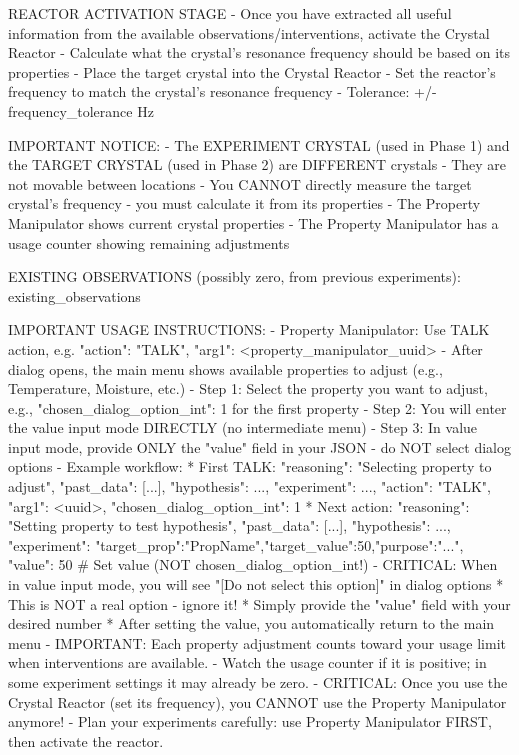 \begin{tcblisting}
REACTOR ACTIVATION STAGE
- Once you have extracted all useful information from the available observations/interventions, activate the Crystal Reactor
- Calculate what the crystal's resonance frequency should be based on its properties
- Place the target crystal into the Crystal Reactor
- Set the reactor's frequency to match the crystal's resonance frequency
- Tolerance: +/-{{ frequency_tolerance }} Hz

IMPORTANT NOTICE:
- The EXPERIMENT CRYSTAL (used in Phase 1) and the TARGET CRYSTAL (used in Phase 2) are DIFFERENT crystals
- They are not movable between locations
- You CANNOT directly measure the target crystal's frequency - you must calculate it from its properties
- The Property Manipulator shows current crystal properties
- The Property Manipulator has a usage counter showing remaining adjustments

EXISTING OBSERVATIONS (possibly zero, from previous experiments):
{{ existing_observations }}

IMPORTANT USAGE INSTRUCTIONS:
- Property Manipulator: Use TALK action, e.g. { "action": "TALK", "arg1": <property_manipulator_uuid> }
  - After dialog opens, the main menu shows available properties to adjust (e.g., Temperature, Moisture, etc.)
  - Step 1: Select the property you want to adjust, e.g., {"chosen_dialog_option_int": 1} for the first property
  - Step 2: You will enter the value input mode DIRECTLY (no intermediate menu)
  - Step 3: In value input mode, provide ONLY the "value" field in your JSON - do NOT select dialog options
  - Example workflow:
    * First TALK: {"reasoning": "Selecting property to adjust", "past_data": [...], "hypothesis": {...}, "experiment": {...}, "action": "TALK", "arg1": <uuid>, "chosen_dialog_option_int": 1}
    * Next action: {"reasoning": "Setting property to test hypothesis", "past_data": [...], "hypothesis": {...}, "experiment": {"target_prop":"PropName","target_value":50,"purpose":"..."}, "value": 50}  # Set value (NOT chosen_dialog_option_int!)
  - CRITICAL: When in value input mode, you will see "[Do not select this option]" in dialog options
    * This is NOT a real option - ignore it!
    * Simply provide the "value" field with your desired number
    * After setting the value, you automatically return to the main menu
  - IMPORTANT: Each property adjustment counts toward your usage limit when interventions are available.
  - Watch the usage counter if it is positive; in some experiment settings it may already be zero.
  - CRITICAL: Once you use the Crystal Reactor (set its frequency), you CANNOT use the Property Manipulator anymore!
  - Plan your experiments carefully: use Property Manipulator FIRST, then activate the reactor.


\end{tcblisting}

